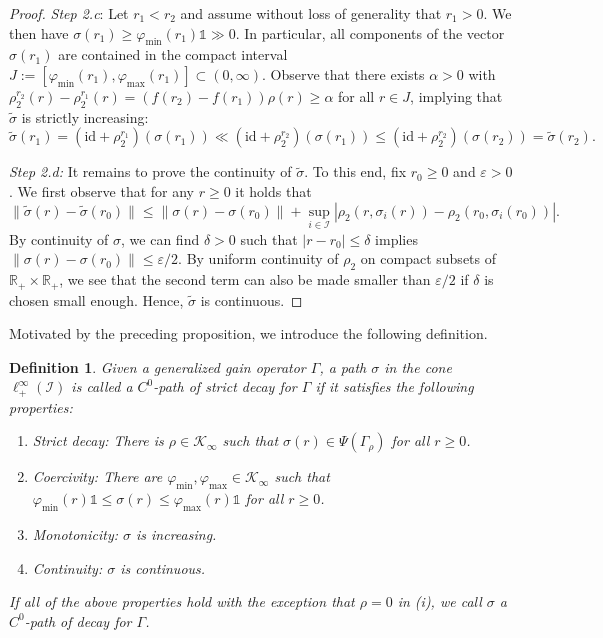 \documentclass[10pt, oneside, a4paper]{article}
\newcommand{\R}{\mathbb{R}}
\newcommand{\tm}{\times}
\newcommand{\ep}{\varepsilon}
\newcommand{\unit}{\mathds{1}}
\newcommand{\id}{\mathrm{id}}
\newcommand{\IC}{\mathcal{I}}
\newcommand{\KC}{\mathcal{K}}
\newtheorem{definition}{Definition}[section]
\begin{document}
\begin{proof}
\emph{Step 2.c}: Let $r_1 < r_2$ and assume without loss of generality that $r_1 > 0$. We then have $\sigma(r_1) \geq \varphi_{\min}(r_1)\unit \gg 0$. In particular, all components of the vector $\sigma(r_1)$ are contained in the compact interval $J := [\varphi_{\min}(r_1),\varphi_{\max}(r_1)] \subset (0,\infty)$. Observe that there exists $\alpha > 0$ with $\rho_2^{r_2}(r) - \rho_2^{r_1}(r) = (f(r_2) - f(r_1))\rho(r) \geq \alpha$ for all $r \in J$, implying that $\tilde{\sigma}$ is strictly increasing:%
\begin{equation*}
  \tilde{\sigma}(r_1) = (\id + \rho_2^{r_1})(\sigma(r_1)) \ll (\id + \rho_2^{r_2})(\sigma(r_1)) \leq (\id + \rho_2^{r_2})(\sigma(r_2)) = \tilde{\sigma}(r_2).%
\end{equation*}

\emph{Step 2.d:} It remains to prove the continuity of $\tilde{\sigma}$. To this end, fix $r_0 \geq 0$ and $\ep > 0$. We first observe that for any $r \geq 0$ it holds that%
\begin{equation*}
  \|\tilde{\sigma}(r) - \tilde{\sigma}(r_0)\| \leq \|\sigma(r) - \sigma(r_0)\| + \sup_{i \in \IC}|\rho_2(r,\sigma_i(r)) - \rho_2(r_0,\sigma_i(r_0))|.%
\end{equation*}
By continuity of $\sigma$, we can find $\delta > 0$ such that $|r - r_0| \leq \delta$ implies $\|\sigma(r) - \sigma(r_0)\| \leq \ep/2$. By uniform continuity of $\rho_2$ on compact subsets of $\R_+ \tm \R_+$, we see that the second term can also be made smaller than $\ep/2$ if $\delta$ is chosen small enough. Hence, $\tilde{\sigma}$ is continuous.
\end{proof}

Motivated by the preceding proposition, we introduce the following definition.%

\begin{definition}\label{def_c0_path}
Given a generalized gain operator $\Gamma$, a path $\sigma$ in the cone $\ell^{\infty}_+(\IC)$ is called a \emph{$C^0$-path of strict decay} for $\Gamma$ if it satisfies the following properties:%
\begin{enumerate}
\item[(i)] \emph{Strict decay}: There is $\rho \in \KC_{\infty}$ such that $\sigma(r) \in \Psi(\Gamma_{\rho})$ for all $r \geq 0$.%
\item[(ii)] \emph{Coercivity}: There are $\varphi_{\min},\varphi_{\max} \in \KC_{\infty}$ such that $\varphi_{\min}(r)\unit \leq \sigma(r) \leq \varphi_{\max}(r)\unit$ for all $r \geq 0$.%
\item[(iii)] \emph{Monotonicity}: $\sigma$ is increasing.%
\item[(iv)] \emph{Continuity}: $\sigma$ is continuous.
\end{enumerate}
If all of the above properties hold with the exception that $\rho = 0$ in (i), we call $\sigma$ a \emph{$C^0$-path of decay} for $\Gamma$.
\end{definition}
\end{document}
